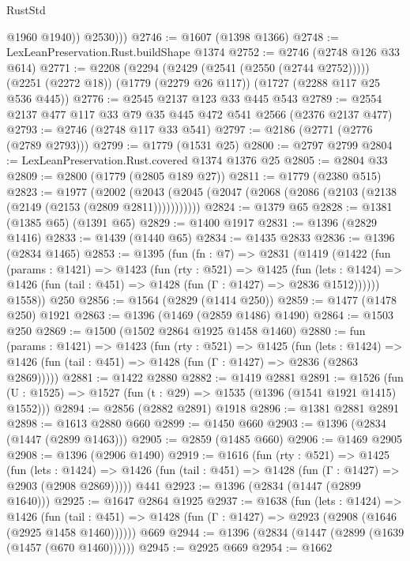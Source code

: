 \begin{lexlean}{RustStd}
\begin{coremodule}
{\begin{coremodule}
{{{{{{{{{{{              @1960
              @1940))
          @2530)))
@2746 := @1607 (@1398 @1366)
@2748 := LexLeanPreservation.Rust.buildShape @1374
@2752 := @2746 (@2748 @126 @33 @614)
@2771 := @2208
    (@2294 (@2429 (@2541 (@2550 (@2744 @2752)))))
    (@2251 (@2272 @18))
    (@1779 (@2279 @26 @117))
    (@1727 (@2288 @117 @25 @536 @445))
@2776 := @2545 @2137 @123 @33 @445 @543
@2789 := @2554 @2137 @477 @117 @33 @79 @35 @445 @472 @541 @2566 (@2376 @2137 @477)
@2793 := @2746 (@2748 @117 @33 @541)
@2797 := @2186 (@2771 (@2776 (@2789 @2793)))
@2799 := @1779 (@1531 @25)
@2800 := @2797 @2799
@2804 := LexLeanPreservation.Rust.covered @1374 @1376 @25
@2805 := @2804 @33
@2809 := @2800 (@1779 (@2805 @189 @27))
@2811 := @1779 (@2380 @515)
@2823 := @1977
    (@2002 (@2043 (@2045 (@2047 (@2068 (@2086 (@2103 (@2138 (@2149 (@2153 (@2809 @2811)))))))))))
@2824 := @1379 @65
@2828 := @1381 (@1385 @65) (@1391 @65)
@2829 := @1400 @1917
@2831 := @1396 (@2829 @1416)
@2833 := @1439 (@1440 @65)
@2834 := @1435 @2833
@2836 := @1396 (@2834 @1465)
@2853 := @1395
    (fun (fn : @7) =>
    @2831
      (@1419
        (@1422
          (fun (params : @1421) =>
          @1423
            (fun (rty : @521) =>
            @1425
              (fun (lets : @1424) =>
              @1426 (fun (tail : @451) => @1428 (fun (Γ : @1427) => @2836 @1512))))))
        @1558))
    @250
@2856 := @1564 (@2829 (@1414 @250))
@2859 := @1477 (@1478 @250) @1921
@2863 := @1396 (@1469 (@2859 @1486) @1490)
@2864 := @1503 @250
@2869 := @1500 (@1502 @2864 @1925 @1458 @1460)
@2880 := fun (params : @1421) =>
  @1423
    (fun (rty : @521) =>
    @1425
      (fun (lets : @1424) =>
      @1426 (fun (tail : @451) => @1428 (fun (Γ : @1427) => @2836 (@2863 @2869)))))
@2881 := @1422 @2880
@2882 := @1419 @2881
@2891 := @1526 (fun (U : @1525) => @1527 (fun (t : @29) => @1535 (@1396 (@1541 @1921 @1415) @1552)))
@2894 := @2856 (@2882 @2891) @1918
@2896 := @1381 @2881 @2891
@2898 := @1613 @2880 @660
@2899 := @1450 @660
@2903 := @1396 (@2834 (@1447 (@2899 @1463)))
@2905 := @2859 (@1485 @660)
@2906 := @1469 @2905
@2908 := @1396 (@2906 @1490)
@2919 := @1616
    (fun (rty : @521) =>
    @1425
      (fun (lets : @1424) =>
      @1426 (fun (tail : @451) => @1428 (fun (Γ : @1427) => @2903 (@2908 @2869)))))
    @441
@2923 := @1396 (@2834 (@1447 (@2899 @1640)))
@2925 := @1647 @2864 @1925
@2937 := @1638
    (fun (lets : @1424) =>
    @1426
      (fun (tail : @451) => @1428 (fun (Γ : @1427) => @2923 (@2908 (@1646 (@2925 @1458 @1460))))))
    @669
@2944 := @1396 (@2834 (@1447 (@2899 (@1639 (@1457 (@670 @1460))))))
@2945 := @2925 @669
@2954 := @1662
}}}}}}}}}}}
\end{coremodule}}
\end{coremodule}
\end{lexlean}
